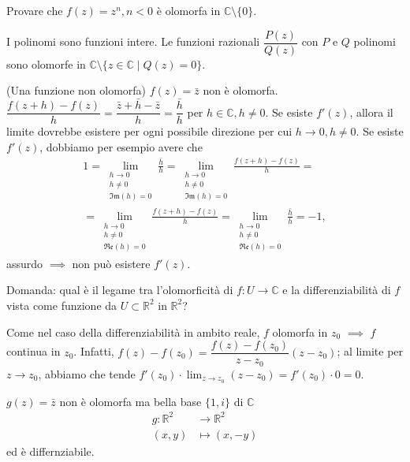 \begin{exc}
  Provare che $f(z)=z^n, n<0$ è olomorfa in $\mathbb{C}\setminus\{0\}$.
\end{exc}

\begin{oss}
  I polinomi sono funzioni intere. Le funzioni razionali $\dfrac{P(z)}{Q(z)}$ con $P$ e $Q$ polinomi sono olomorfe in $\mathbb{C} \setminus \{z \in \mathbb{C} \mid Q(z)=0\}$.
\end{oss}

\begin{ex}
  (Una funzione non olomorfa) $f(z)=\bar{z}$ non è olomorfa. $\dfrac{f(z+h)-f(z)}{h}=\dfrac{\bar{z}+\bar{h}-\bar{z}}{h}=\dfrac{\bar{h}}{h}$ per $h \in \mathbb{C}, h \not=0$. Se esiste $f'(z)$, allora il limite dovrebbe esistere per ogni possibile direzione per cui $h \rightarrow 0, h\not=0$. Se esiste $f'(z)$, dobbiamo per esempio avere che
  \begin{align*}
    1=\lim_{\substack{h \rightarrow 0 \\ h\not=0 \\ \mathfrak{Im}(h)=0}} \frac{\bar{h}}{h}=\lim_{\substack{h \rightarrow 0 \\ h\not=0 \\ \mathfrak{Im}(h)=0}} \frac{f(z+h)-f(z)}{h}=\\
    =\lim_{\substack{h \rightarrow 0 \\ h\not=0 \\ \mathfrak{Re}(h)=0}} \frac{f(z+h)-f(z)}{h}=\lim_{\substack{h \rightarrow 0 \\ h\not=0 \\ \mathfrak{Re}(h)=0}} \frac{\bar{h}}{h}=-1,
  \end{align*}
  assurdo $\implies$ non può esistere $f'(z)$.
\end{ex}

Domanda: qual è il legame tra l'olomorficità di $f:U \rightarrow \mathbb{C}$ e la differenziabilità di $f$ vista come funzione da $U \subset \mathbb{R}^2$ in $\mathbb{R}^2$?

\begin{oss}
  Come nel caso della differenziabilità in ambito reale, $f$ olomorfa in $z_0$ $\implies$ $f$ continua in $z_0$. Infatti, $f(z)-f(z_0)=\dfrac{f(z)-f(z_0)}{z-z_0}(z-z_0)$; al limite per $z \rightarrow z_0$, abbiamo che tende  $\displaystyle f'(z_0) \cdot \lim_{z \rightarrow z_0} (z-z_0)=f'(z_0) \cdot 0=0$.
\end{oss}

\begin{ex}
  $g(z)=\bar{z}$ non è olomorfa ma bella base $\{1, i\}$ di $\mathbb{C}$
  \begin{align*}
    g: \mathbb{R}^2 &\rightarrow \mathbb{R}^2\\
    (x, y) &\mapsto (x, -y)
  \end{align*}
  ed è differnziabile.
\end{ex}
